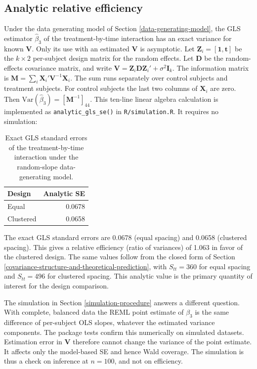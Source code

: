 \documentclass[
  11pt,
]{article}
\begin{document}
\subsection{Analytic relative efficiency}\label{analytic-relative-efficiency}

Under the data generating model of Section
\ref{data-generating-model}, the GLS estimator \(\hat{\beta}_3\) of
the treatment-by-time interaction has an exact variance for known
\(\mathbf{V}\). Only its use with an estimated \(\mathbf{V}\) is
asymptotic. Let
\(\mathbf{Z}_i = [\mathbf{1}, \mathbf{t}]\) be the \(k \times 2\)
per-subject design matrix for the random effects. Let
\(\mathbf{D}\) be the random-effects covariance matrix, and write
\(\mathbf{V} = \mathbf{Z}_i \mathbf{D} \mathbf{Z}_i' + \sigma^2
\mathbf{I}_k\). The information matrix is
\(\mathbf{M} = \sum_i \mathbf{X}_i' \mathbf{V}^{-1} \mathbf{X}_i\).
The sum runs separately over control subjects and treatment
subjects. For control subjects the last two columns of
\(\mathbf{X}_i\) are zero. Then
\(\text{Var}(\hat{\beta}_3) = [\mathbf{M}^{-1}]_{44}\). This
ten-line linear algebra calculation is implemented as
\texttt{analytic\_gls\_se()} in \texttt{R/simulation.R}. It requires no
simulation:

\begin{table}[!h]
\centering
\caption{\label{tab:analytic-efficiency}Exact GLS standard errors of the treatment-by-time interaction under the random-slope data-generating model.}
\centering
\fontsize{10}{12}\selectfont
\begin{tabular}[t]{lr}
\toprule
Design & Analytic SE\\
\midrule
Equal & 0.0678\\
Clustered & 0.0658\\
\bottomrule
\end{tabular}
\end{table}

The exact GLS standard errors are
0.0678 (equal spacing) and
0.0658 (clustered spacing).
This gives a relative efficiency (ratio of variances) of
1.063 in favor of the clustered design.
The same values follow from the closed form of Section
\ref{covariance-structure-and-theoretical-prediction}, with
\(S_{tt} = 360\) for equal spacing and
\(S_{tt} = 496\) for clustered
spacing. This analytic value is the primary quantity of interest
for the design comparison.

The simulation in Section \ref{simulation-procedure} answers a
different question. With complete, balanced data the REML point
estimate of \(\beta_3\) is the same difference of per-subject OLS
slopes, whatever the estimated variance components. The package
tests confirm this numerically on simulated datasets. Estimation
error in \(\mathbf{V}\) therefore cannot change the variance of the
point estimate. It affects only the model-based SE and hence Wald
coverage. The simulation is thus a check on inference at
\(n = 100\), and not on efficiency.
\end{document}
